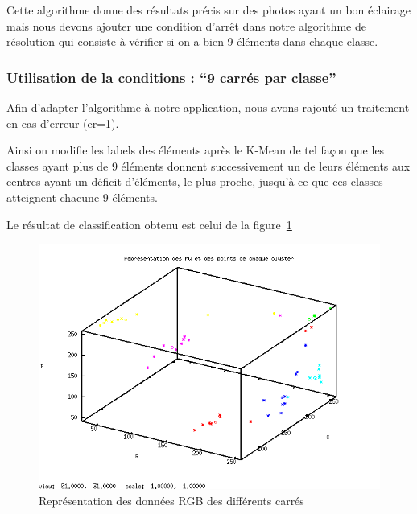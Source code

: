   Cette algorithme donne des résultats précis sur des photos ayant un bon éclairage mais nous devons ajouter une condition d'arrêt dans notre algorithme de résolution qui consiste à vérifier si on a bien 9 éléments dans chaque classe. 

\subsubsection{Utilisation de la conditions : ``9 carrés par classe''}

  Afin d'adapter l'algorithme à notre application, nous avons rajouté un traitement en cas d'erreur (er=1). 

  Ainsi on modifie les labels des éléments après le K-Mean de tel façon que les classes ayant plus de 9 éléments donnent successivement un de leurs éléments aux centres ayant un déficit d'éléments, le plus proche, jusqu'à ce que ces classes atteignent chacune 9 éléments. 

  Le résultat de classification obtenu est celui de la figure~\ref{RGBnok}
  \begin{figure}[h!]
    \centering
    \includegraphics[width=0.5\linewidth]{./Images/RGB_nok.png}
    \caption{Représentation des données RGB des différents carrés}
    \label{RGBnok}
   \end{figure}

% 
% 
% 
